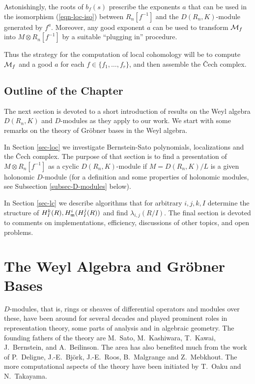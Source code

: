 Astonishingly, the roots of $b_f(s)$ prescribe the exponents $a$ that
can be used in the isomorphism (\ref{eqn-loc-iso}) 
between $R_n[f^{-1}]$ and the
$D(R_n,K)$-module generated by $f^{a}$. Moreover, any
 good exponent $a$ can be used to transform ${\mathcal M}_f$ into
$M\otimes R_n[f^{-1}]$ by a suitable ``plugging in'' procedure. 

Thus the strategy for the computation of local cohomology will be
to compute ${\mathcal M}_f$ and a good $a$ for each $f\in\{f_1,\ldots,f_r\}$,
and then assemble the \v Cech complex.

\subsection{Outline of the Chapter}
The next section is devoted to a short introduction of results on
the Weyl algebra $D(R_n,K)$ and $D$-modules as they apply to our
work. 
We start with some remarks on the theory of Gr\"obner
bases in the Weyl algebra.

In Section \ref{sec-loc} we investigate Bernstein-Sato polynomials,
localizations and the \v Cech complex.
The purpose of
that section is to find a 
presentation of $M\otimes R_n[f^{-1}]$ as a cyclic $D(R_n,K)$-module 
if $M=D(R_n,K)/L$
is a given holonomic $D$-module (for a definition and some properties
of holonomic modules, see Subsection \ref{subsec-D-modules} below).



In
Section \ref{sec-lc} we describe 
algorithms that for
arbitrary $i,j,k,I$ 
determine the structure of
$H^k_I(R), H^i_{\mathfrak m} (H^j_I(R))$ and find $\lambda_{i,j}(R/I)$. 
The final section is devoted to comments on 
implementations, efficiency, discussions of other topics, and open problems.



%
\section{The Weyl Algebra and Gr\"obner Bases}

$D$-modules, that is, rings or sheaves of differential operators and
modules over these, have been around for several decades and played
prominent roles in representation theory, some parts of analysis and
in algebraic geometry. The founding fathers of the theory are 
M.\ Sato, M.\ Kashiwara, T.\ Kawai, J.\ Bernstein, and A.\ Beilinson.
 The area has also benefited much from the work of P.\ Deligne,
J.-E.\ Bj\"ork, J.-E.\ Roos, 
B.\ Malgrange and  Z.\ Mebkhout. The more computational aspects of the
theory have been initiated by T.\ Oaku and N.\ Takayama.

